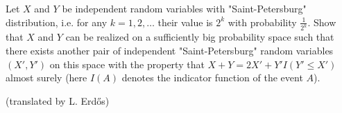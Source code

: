 Let $X$ and $Y$ be independent random variables with "Saint-Petersburg" distribution, i.e. for any $k=1,2,\ldots$ their value is $2^k$ with probability $\frac{1}{2^k}$. Show that $X$ and $Y$ can be realized on a sufficiently big probability space such that there exists another pair of independent "Saint-Petersburg" random variables $(X', Y')$ on this space with the property that $X+Y=2X'+Y'I(Y'\le X')$ almost surely (here $I(A)$ denotes the indicator function of the event $A$).

(translated by L. Erdős)